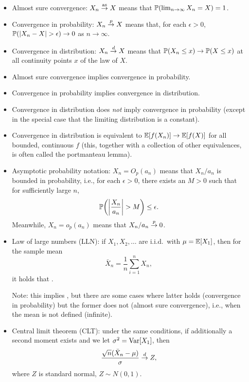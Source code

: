 \documentclass{article}
\begin{document}
\begin{itemize}
\item Almost sure convergence: $X_n \asto X$ means that 
  $\P(\lim_{n\to \infty} X_n = X ) = 1$.   

\item Convergence in probability: $X_n \pto X$ means that, for each
  $\epsilon>0$, $\P(|X_n - X| > \epsilon) \to 0$ as $n \to \infty$.  

\item Convergence in distribution: $X_n \dto X$ means that $\P(X_n \leq x) \to 
  \P(X \leq x)$ at all continuity points $x$ of the law of $X$. 

\item Almost sure convergence implies convergence in probability. 

\item Convergence in probability implies convergence in distribution.

\item Convergence in distribution does \emph{not} imply convergence in
  probability (except in the special case that the limiting distribution is a
  constant).   

\item Convergence in distribution is equivalent to $\E[ f(X_n) ] \to \E[ f(X) ]$
  for all bounded, continuous $f$ (this, together with a collection of other
  equivalences, is often called the portmanteau lemma).  

\item Asymptotic probability notation: $X_n = O_p(a_n)$ means that $X_n/a_n$ is
  bounded in probability, i.e., for each $\epsilon>0$, there exists an $M>0$
  such that for sufficiently large $n$,
  \[
  \P\bigg( \bigg|\frac{X_n}{a_n}\bigg| > M \bigg) \leq \epsilon.
  \]
  Meanwhile, $X_n = o_p(a_n)$ means that $X_n/a_n \pto 0$. 

\item Law of large numbers (LLN): if $X_1,X_2,\dots$ are i.i.d.\ with $\mu =
  \E[X_1]$, then for the sample mean 
  \[
  \bar{X}_n = \frac{1}{n} \sum_{i=1}^n X_n,
  \]
  it holds that .

  Note: this implies , but there are some cases
  where latter holds (convergence in probability) but the former does not
  (almost sure convergence), i.e., when the mean is not defined (infinite). 

\item Central limit theorem (CLT): under the same conditions, if additionally a
  second moment exists and we let $\sigma^2 = \Var[X_1]$, then
  \[
  \frac{\sqrt{n}(\bar{X}_n - \mu)}{\sigma} \dto Z,
  \]
  where $Z$ is standard normal, $Z \sim N(0,1)$. 


\end{itemize}
\end{document}
